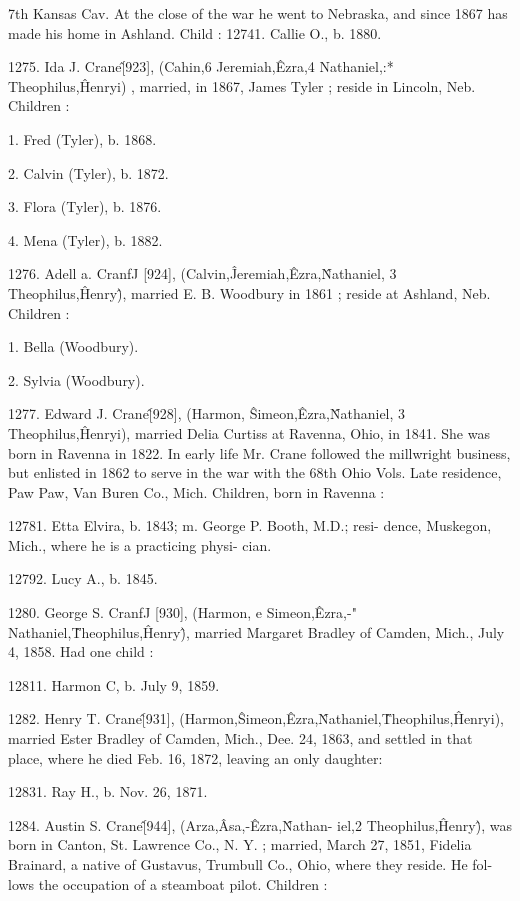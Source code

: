 \documentclass{book}
\begin{document}
7th Kansas Cav. At the close of the war he went to Nebraska, 
and since 1867 has made his home in Ashland. Child : 
12741. Callie O., b. 1880. 

1275. Ida J. Crane\^ [923], (Cahin,6 Jeremiah,\^ Ezra,4 
Nathaniel,:* Theophilus,\^ Henryi) , married, in 1867, James Tyler ; 
reside in Lincoln, Neb. Children : 

1. Fred (Tyler), b. 1868. 

2. Calvin (Tyler), b. 1872. 

3. Flora (Tyler), b. 1876. 

4. Mena (Tyler), b. 1882. 

1276. Adell a. CranfJ [924], (Calvin,\^ Jeremiah,\^ Ezra,\^ 
Nathaniel, 3 Theophilus,\^ Henry\^), married E. B. Woodbury in 
1861 ; reside at Ashland, Neb. Children : 

1. Bella (Woodbury). 

2. Sylvia (Woodbury). 

1277. Edward J. Crane\^ [928], (Harmon, \^ Simeon,\^ Ezra,\^ 
Nathaniel, 3 Theophilus,\^ Henryi), married Delia Curtiss at 
Ravenna, Ohio, in 1841. She was born in Ravenna in 1822. 
In early life Mr. Crane followed the millwright business, but 
enlisted in 1862 to serve in the war with the 68th Ohio Vols. 
Late residence, Paw Paw, Van Buren Co., Mich. Children, born 
in Ravenna : 

12781. Etta Elvira, b. 1843; m. George P. Booth, M.D.; resi- 
dence, Muskegon, Mich., where he is a practicing physi- 
cian. 

12792. Lucy A., b. 1845. 

1280. George S. CranfJ [930], (Harmon, e Simeon,\^ Ezra,-" 
Nathaniel,\^ Theophilus,\^ Henry\^), married Margaret Bradley of 
Camden, Mich., July 4, 1858. Had one child : 

12811. Harmon C, b. July 9, 1859. 

1282. Henry T. Crane\^ [931], (Harmon,\^ Simeon,\^ Ezra,\^ 
Nathaniel,\^ Theophilus,\^ Henryi), married Ester Bradley of 
Camden, Mich., Dee. 24, 1863, and settled in that place, where 
he died Feb. 16, 1872, leaving an only daughter: 

12831. Ray H., b. Nov. 26, 1871. 

1284. Austin S. Crane\^ [944], (Arza,\^ Asa,-\^ Ezra,\^ Nathan- 
iel,2 Theophilus,\^ Henry\^), was born in Canton, St. Lawrence 
Co., N. Y. ; married, March 27, 1851, Fidelia Brainard, a native 
of Gustavus, Trumbull Co., Ohio, where they reside. He fol- 
lows the occupation of a steamboat pilot. Children : 
\end{document}
